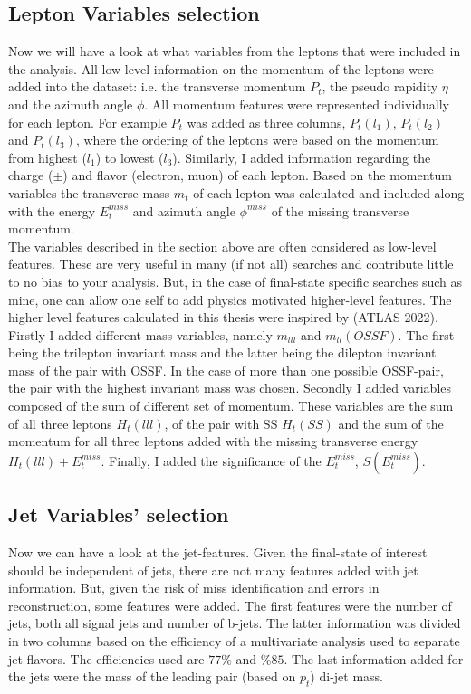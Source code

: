 \subsection{Lepton Variables selection}\label{subsec:LepSel}
Now we will have a look at what variables from the leptons that were included in the analysis. All low level information on the
momentum of the leptons were added into the dataset: i.e. the transverse momentum $P_t$, the pseudo rapidity $\eta$ and the azimuth
angle $\phi$. All momentum features were represented individually for each lepton. For example $P_t$ was added as three columns, $P_t(l_1)$,
$P_t(l_2)$ and $P_t(l_3)$, where the ordering of the leptons were based on the momentum from highest ($l_1$) to lowest ($l_3$).
Similarly, I added information regarding the charge ($\pm$) and flavor (electron, muon) of each lepton. Based on the momentum variables
the transverse mass $m_t$ of each lepton was calculated and included along with the energy $E_t^{miss}$ and azimuth angle $\phi^{miss}$ of
the missing transverse momentum.
\\
The variables described in the section above are often considered as low-level features. These are very useful in many (if not all)
searches and contribute little to no bias to your analysis. But, in the case of final-state specific searches such as mine,
one can allow one self to add physics motivated higher-level features. The higher level features calculated in this thesis
were inspired by \cite{franchini_search_2019} (ATLAS 2022). 
\\
Firstly I added different mass variables, namely $m_{lll}$ and $m_{ll}(OSSF)$. The first being the trilepton invariant mass 
and the latter being the dilepton invariant mass of the pair with \ac{OSSF}. In the case of more than one possible OSSF-pair,
the pair with the highest invariant mass was chosen. Secondly I added variables composed of the sum of different set of momentum.
These variables are the sum of all three leptons $H_t(lll)$, of the pair with \ac{SS} $H_t(SS)$ and the sum of the momentum
for all three leptons added with the missing transverse energy $H_t(lll) + E_t^{miss}$. Finally, I added the significance of the
$E_t^{miss}$, $S(E_t^{miss})$.
\subsection{Jet Variables' selection}\label{subsec:JetSel}
Now we can have a look at the jet-features. Given the final-state of interest should be independent of jets, there are not many
features added with jet information. But, given the risk of miss identification and errors in reconstruction, some features were 
added. The first features were the number of jets, both all signal jets and number of b-jets.
The latter information was divided in two columns based on the efficiency of a multivariate analysis used to separate jet-flavors.
The efficiencies used are $77\%$ and $\%85$. The last information added for the jets were the mass of the leading pair (based on $p_t$)
di-jet mass.
